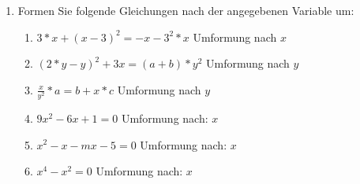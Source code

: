 \documentclass{scrartcl}
\begin{document}
			\begin{enumerate}
				\item Formen Sie folgende Gleichungen nach der angegebenen Variable um:
				\begin{enumerate}
					\item $3*x + (x-3)^2 = -x-3^2*x$ \quad Umformung nach $x$ 
					\item $(2*y-y)^2+3x=(a+b)*y^2$ \quad Umformung nach $y$ 
					\item $\frac{x}{y^2}*a = b+x*c$ \quad Umformung nach $y$
					\item $9x^2 - 6x + 1 = 0$ \quad Umformung nach: $x$
					\item $x^2 - x - mx -5 = 0$ \quad Umformung nach: $x$
					\item $x^4 - x^2 = 0$ \quad Umformung nach: $x$ 
				\end{enumerate}
		\end{enumerate} 
	
	
\end{document}
